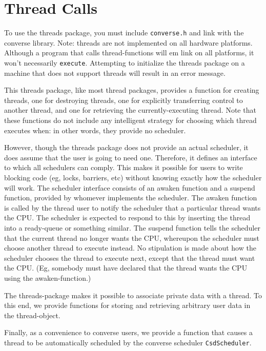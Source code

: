 \section{Thread Calls}

To use the threads package, you must include {\tt converse.h} and link
with the converse library.  Note: threads are not implemented on all
hardware platforms.  Although a program that calls thread-functions
will {em link} on all platforms, it won't necessarily {\tt execute}.
Attempting to initialize the threads package on a machine that does
not support threads will result in an error message.

This threads package, like most thread packages, provides a function
for creating threads, one for destroying threads, one for explicitly
transferring control to another thread, and one for retrieving the
currently-executing thread.  Note that these functions do not include
any intelligent strategy for choosing which thread executes when: in
other words, they provide no scheduler.

However, though the threads package does not provide an actual
scheduler, it does assume that the user is going to need one.
Therefore, it defines an interface to which all schedulers can comply.
This makes it possible for users to write blocking code (eg, locks,
barriers, etc) without knowing exactly how the scheduler will work.
The scheduler interface consists of an awaken function and a suspend
function, provided by whomever implements the scheduler.  The awaken
function is called by the thread user to notify the scheduler that a
particular thread wants the CPU.  The scheduler is expected to respond
to this by inserting the thread into a ready-queue or something
similar.  The suspend function tells the scheduler that the current
thread no longer wants the CPU, whereupon the scheduler must choose
another thread to execute instead.  No stipulation is made about how
the scheduler chooses the thread to execute next, except that the
thread must want the CPU. (Eg, somebody must have declared that the
thread wants the CPU using the awaken-function.)

The threads-package makes it possible to associate private data
with a thread.  To this end, we provide functions for storing and
retrieving arbitrary user data in the thread-object.

Finally, as a convenience to converse users, we provide a function
that causes a thread to be automatically scheduled by the converse
scheduler {\tt CsdScheduler}.


